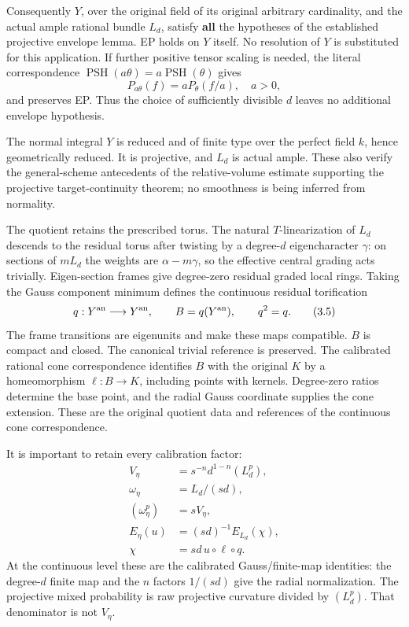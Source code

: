 \documentclass[
  10pt,
]{article}
\begin{document}
Consequently \(Y\), over the original field of its original arbitrary
cardinality, and the actual ample rational bundle \(L_d\), satisfy
\textbf{all} the hypotheses of the established projective envelope
lemma. EP holds on \(Y\) itself. No resolution of \(Y\) is substituted
for this application. If further positive tensor scaling is needed, the
literal correspondence
\(\operatorname{PSH}(a\theta)=a\operatorname{PSH}(\theta)\) gives \[
                    P_{a\theta}(f)=aP_\theta(f/a),\quad a>0,    \tag{3.4}
\] and preserves EP. Thus the choice of sufficiently divisible \(d\)
leaves no additional envelope hypothesis.

The normal integral \(Y\) is reduced and of finite type over the perfect
field \(k\), hence geometrically reduced. It is projective, and \(L_d\)
is actual ample. These also verify the general-scheme antecedents of the
relative-volume estimate supporting the projective target-continuity
theorem; no smoothness is being inferred from normality.

The quotient retains the prescribed torus. The natural
\(T\)-linearization of \(L_d\) descends to the residual torus after
twisting by a degree-\(d\) eigencharacter \(\gamma\): on sections of
\(mL_d\) the weights are \(\alpha-m\gamma\), so the effective central
grading acts trivially. Eigen-section frames give degree-zero residual
graded local rings. Taking the Gauss component minimum defines the
continuous residual torification \[
 q:Y^{\rm an}\longrightarrow Y^{\rm an},\qquad B=q(Y^{\rm an}),\qquad
 q^2=q.                                                        \tag{3.5}
\] The frame transitions are eigenunits and make these maps compatible.
\(B\) is compact and closed. The canonical trivial reference is
preserved. The calibrated rational cone correspondence identifies \(B\)
with the original \(K\) by a homeomorphism \(\ell:B\to K\), including
points with kernels. Degree-zero ratios determine the base point, and
the radial Gauss coordinate supplies the cone extension. These are the
original quotient data and references of the continuous cone
correspondence.

It is important to retain every calibration factor: \[
 \begin{split}
 V_\eta&=s^{-n}d^{1-n}(L_d^p),\\
 \omega_\eta&=L_d/(sd),\\
 (\omega_\eta^p)&=sV_\eta,\\
 E_\eta(u)&=(sd)^{-1}E_{L_d}(\chi),\\
 \chi&=sd\,u\circ\ell\circ q.
 \end{split}                                                   \tag{3.6}
\] At the continuous level these are the calibrated Gauss/finite-map
identities: the degree-\(d\) finite map and the \(n\) factors \(1/(sd)\)
give the radial normalization. The projective mixed probability is raw
projective curvature divided by \((L_d^p)\). That denominator is not
\(V_\eta\).
\end{document}
